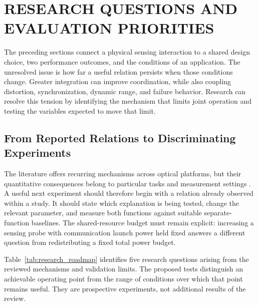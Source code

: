 \section{RESEARCH QUESTIONS AND EVALUATION PRIORITIES}
\label{sec:discussion_roadmap}

The preceding sections connect a physical sensing interaction to a shared
design choice, two performance outcomes, and the conditions of an application.
The unresolved issue is how far a useful relation persists when those
conditions change. Greater integration can improve coordination, while also
coupling distortion, synchronization, dynamic range, and failure behavior.
Research can resolve this tension by identifying the mechanism that limits
joint operation and testing the variables expected to move that limit.

\subsection{From Reported Relations to Discriminating Experiments}

The literature offers recurring mechanisms across optical platforms, but their
quantitative consequences belong to particular tasks and measurement settings
\cite{Wen2024OISACArchitectures,Su2025OISACTheoryPractice,
Khorasgani2026GeneralOpticalISACSurvey}. A useful next experiment should
therefore begin with a relation already observed within a study. It should
state which explanation is being tested, change the relevant parameter, and
measure both functions against suitable separate-function baselines. The
shared-resource budget must remain explicit: increasing a sensing probe with
communication launch power held fixed answers a different question from
redistributing a fixed total power budget.

Table~\ref{tab:research_roadmap} identifies five research questions arising from
the reviewed mechanisms and validation limits. The proposed tests distinguish
an achievable operating point from the range of conditions over which that
point remains useful. They are prospective experiments, not additional results
of the review.

